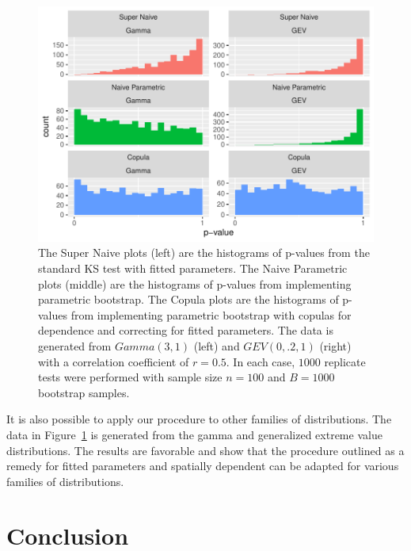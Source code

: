 \documentclass[12pt, letterpaper, titlepage]{article}
\begin{document}
\begin{figure}[tbp]
  \centering
  \includegraphics[width=\textwidth]{hist_gamma_gev_FD}
  \caption{The Super Naive plots (left) are the histograms of p-values from the
  standard KS test with fitted parameters. The Naive Parametric plots (middle)
  are the histograms of p-values from implementing parametric bootstrap. The
  Copula plots are the histograms of p-values from implementing parametric
  bootstrap with copulas for dependence and correcting for fitted parameters.
  The data is generated from $Gamma(3, 1)$ (left) and $GEV(0, .2, 1)$ (right)
  with a correlation coefficient of $r = 0.5$. In each case, $1000$ replicate
  tests were performed with sample size $n = 100$ and $B = 1000$ bootstrap
  samples.}
  \label{fig:hist_gamma_gev_FD}
\end{figure}

It is also possible to apply our procedure to other families of distributions.
The data in Figure~\ref{fig:hist_gamma_gev_FD} is generated from the gamma and
generalized extreme value distributions. The results are favorable and show that
the procedure outlined as a remedy for fitted parameters and spatially dependent
can be adapted for various families of distributions.


\section{Conclusion}
\label{sec:conclusion}
\end{document}
